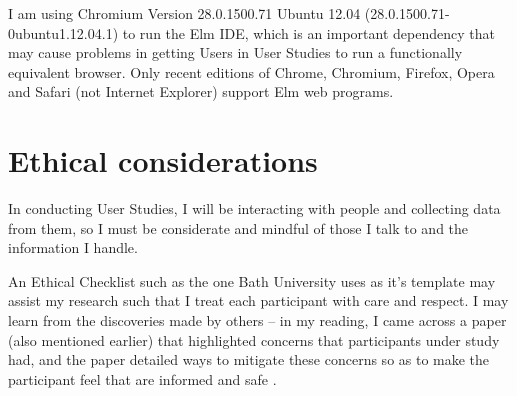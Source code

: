 I am using Chromium Version 28.0.1500.71 Ubuntu 12.04
(28.0.1500.71-0ubuntu1.12.04.1) to run the Elm IDE, which is an important
dependency that may cause problems in getting Users in User Studies to run a
functionally equivalent browser. Only recent editions of Chrome, Chromium,
Firefox, Opera and Safari (not Internet Explorer) support Elm web programs.

\chapter{Ethical considerations}

In conducting User Studies, I will be interacting with people and collecting
data from them, so I must be considerate and mindful of those I talk to and the
information I handle.

An Ethical Checklist such as the one Bath University uses as it's template
\cite{Bath2013a} may assist my research such that I treat each participant
with care and respect. I may learn from the discoveries made by others -- in my
reading, I came across a paper (also mentioned earlier) that highlighted concerns that
participants under study had, and the paper detailed ways to mitigate these
concerns so as to make the participant feel that are informed and safe
\cite{Yates2012a}.
